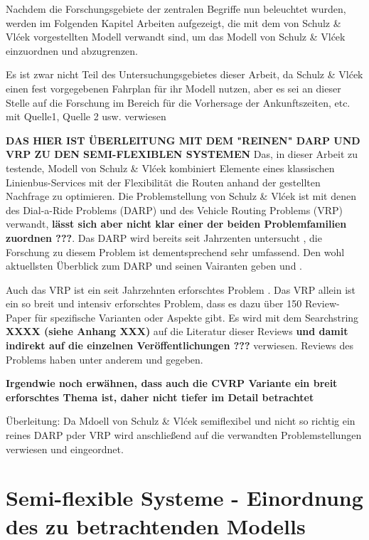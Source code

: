 Nachdem die Forschungsgebiete der zentralen Begriffe nun beleuchtet wurden, werden im Folgenden Kapitel Arbeiten aufgezeigt, die mit dem von Schulz \& Vlćek vorgestellten Modell verwandt sind, um das Modell von Schulz \& Vlćek einzuordnen und abzugrenzen.

Es ist zwar nicht Teil des Untersuchungsgebietes dieser Arbeit, da Schulz \& Vlćek einen fest vorgegebenen Fahrplan für ihr Modell nutzen, aber es sei an dieser Stelle auf die Forschung im Bereich für die Vorhersage der Ankunftszeiten, etc. mit Quelle1, Quelle 2 usw. verwiesen

\textbf{DAS HIER IST ÜBERLEITUNG MIT DEM "REINEN" DARP UND VRP ZU DEN SEMI-FLEXIBLEN SYSTEMEN}
Das, in dieser Arbeit zu testende, Modell von Schulz \& Vlćek kombiniert Elemente eines klassischen Linienbus-Services mit der Flexibilität die Routen anhand der gestellten Nachfrage zu optimieren. Die Problemstellung von Schulz \& Vlćek ist mit denen des Dial-a-Ride Problems (DARP) und des Vehicle Routing Problems (VRP) verwandt, \textbf{lässt sich aber nicht klar einer der beiden Problemfamilien zuordnen ???}. Das DARP wird bereits seit Jahrzenten untersucht \parencite{psaraftis_dynamic_1980}, die Forschung zu diesem Problem ist dementsprechend sehr umfassend. Den wohl aktuellsten Überblick zum DARP und seinen Vairanten geben \textcite{molenbruch_typology_2017} und \textcite{ho_survey_2018}. 

Auch das VRP ist ein seit Jahrzehnten erforschtes Problem \parencite{orloff_fundamental_1974}. Das VRP allein ist ein so breit und intensiv erforschtes Problem, dass es dazu über 150 Review-Paper für spezifische Varianten oder Aspekte gibt. Es wird mit dem Searchstring \textbf{XXXX (siehe Anhang XXX)} auf die Literatur dieser Reviews \textbf{und damit indirekt auf die einzelnen Veröffentlichungen ???} verwiesen. Reviews des Problems haben unter anderem \textcite{braekers_vehicle_2016} und \textcite{vidal_concise_2020} gegeben. 

\textbf{Irgendwie noch erwähnen, dass auch die CVRP Variante ein breit erforschtes Thema ist, daher nicht tiefer im Detail betrachtet}

Überleitung: Da Mdoell von Schulz \& Vlćek semiflexibel und nicht so richtig ein reines DARP pder VRP wird anschließend auf die verwandten Problemstellungen verwiesen und eingeordnet.


\section{Semi-flexible Systeme - Einordnung des zu betrachtenden Modells}
\label{sec:Einordnung}
\label{sec:2.2}


